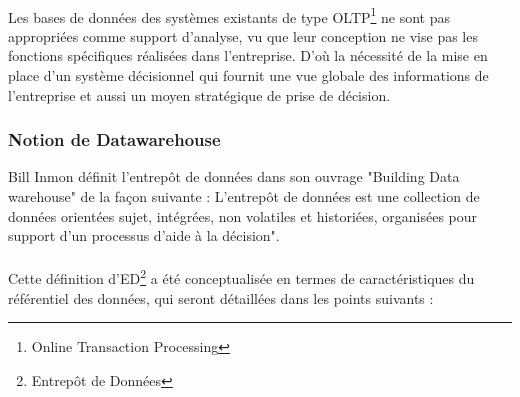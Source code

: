\paragraph{}
Les bases de données des systèmes existants de type OLTP\footnote{Online Transaction Processing} ne sont pas appropriées comme support d’analyse, vu que leur conception ne vise pas les fonctions spécifiques réalisées dans l’entreprise. D’où la nécessité de la mise en place d’un système décisionnel qui fournit une vue globale des informations de l’entreprise et aussi un moyen stratégique de prise de décision.

\subsubsection{Notion de Datawarehouse}
Bill Inmon définit l’entrepôt de données dans son ouvrage "Building Data warehouse" de la façon suivante : L’entrepôt de données est une collection de données orientées sujet, intégrées, non volatiles et historiées, organisées pour support d’un processus d’aide à la décision".
\paragraph{}
Cette définition d’ED\footnote{Entrepôt de Données} a été conceptualisée en termes de caractéristiques du référentiel des données, qui seront détaillées dans les points suivants :

